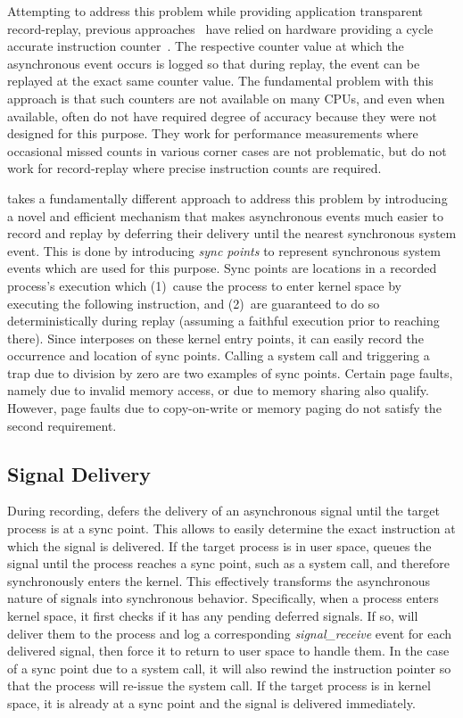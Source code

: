 Attempting to address this problem while providing application
transparent record-replay, previous
approaches~\cite{bressoud-tft,bressoud,revirt,smp-revirt} 
have relied on hardware providing a cycle accurate instruction
counter~\cite{slye96}.  The respective counter value at which the
asynchronous event occurs is logged so that during replay, the event
can be replayed at the exact same counter value.  The fundamental
problem with this approach is that such counters are not available on
many CPUs, and even when available, often do not have required degree
of accuracy because they were not designed for this purpose.  They
work for performance measurements where occasional missed counts in
various corner cases are not problematic, but do not work for
record-replay where precise instruction counts are required. 

\scribe{} takes a fundamentally different approach to address this
problem by introducing a novel and efficient mechanism that makes
asynchronous events much easier to record and replay by deferring
their delivery until the nearest synchronous system event.  This is
done by introducing {\em sync points} to represent synchronous system
events which are used for this purpose.  Sync points
are locations in a recorded process's execution which (1)~cause the
process to enter kernel space by executing the following instruction,
and (2)~are guaranteed to do so deterministically during replay
(assuming a faithful execution prior to reaching there). Since
\scribe{} interposes on these kernel entry points, it can easily
record the occurrence and location of sync points. Calling a system
call and triggering a trap due to division by zero are two examples of
sync points. Certain page faults, namely due to invalid memory access,
or due to memory sharing also qualify.
However, page faults due to copy-on-write or memory paging do not
satisfy the second requirement.

\subsection{Signal Delivery}

During recording, \scribe{} defers the delivery of an asynchronous
signal until the target process is at a sync point.  This allows
\scribe{} to easily determine the exact instruction at which the signal
is delivered.  If the target process is in user space, \scribe{} queues
the signal
until the process reaches a sync
point, such as a system call, and therefore synchronously enters the
kernel.  This effectively transforms the asynchronous nature of
signals into synchronous behavior.  Specifically, when a process
enters kernel space, it first checks if it has any pending deferred
signals.  If so, \scribe{} will deliver them to the process and log a
corresponding {\em signal\_receive} event for each delivered signal,
then force it to return to user space to handle them.  In the case of a
sync point due to a system call, it will also rewind the instruction
pointer so that the process will re-issue the system call. 
If the target process is in kernel space, it is already at a sync point
and the signal is delivered immediately. 

